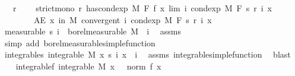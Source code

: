 \begin{isabellebody}
\ \ \ r\ \isanewline
\ \ \ {\isachardoublequoteopen}strict{\isacharunderscore}{\kern0pt}mono\ r{\isachardoublequoteclose}\ {\isachardoublequoteopen}has{\isacharunderscore}{\kern0pt}cond{\isacharunderscore}{\kern0pt}exp\ M\ F\ f\ {\isacharparenleft}{\kern0pt}{\isasymlambda}x{\isachardot}{\kern0pt}\ lim\ {\isacharparenleft}{\kern0pt}{\isasymlambda}i{\isachardot}{\kern0pt}\ cond{\isacharunderscore}{\kern0pt}exp\ M\ F\ {\isacharparenleft}{\kern0pt}s\ {\isacharparenleft}{\kern0pt}r\ i{\isacharparenright}{\kern0pt}{\isacharparenright}{\kern0pt}\ x{\isacharparenright}{\kern0pt}{\isacharparenright}{\kern0pt}{\isachardoublequoteclose}\ \isanewline
\ \ \ \ \ \ \ \ {\isachardoublequoteopen}AE\ x\ in\ M{\isachardot}{\kern0pt}\ convergent\ {\isacharparenleft}{\kern0pt}{\isasymlambda}i{\isachardot}{\kern0pt}\ cond{\isacharunderscore}{\kern0pt}exp\ M\ F\ {\isacharparenleft}{\kern0pt}s\ {\isacharparenleft}{\kern0pt}r\ i{\isacharparenright}{\kern0pt}{\isacharparenright}{\kern0pt}\ x{\isacharparenright}{\kern0pt}{\isachardoublequoteclose}\isanewline
%
\isadelimproof
%
\endisadelimproof
%
\isatagproof
{}\isamarkupfalse%
\ {\isacharminus}{\kern0pt}\isanewline
\ \ \isamarkupfalse%
\ {\isacharbrackleft}{\kern0pt}measurable{\isacharbrackright}{\kern0pt}{\isacharcolon}{\kern0pt}\ {\isachardoublequoteopen}{\isacharparenleft}{\kern0pt}s\ i{\isacharparenright}{\kern0pt}\ {\isasymin}\ borel{\isacharunderscore}{\kern0pt}measurable\ M{\isachardoublequoteclose}\ \ i\ \isamarkupfalse%
\ assms{\isacharparenleft}{\kern0pt}{}{\isacharparenright}{\kern0pt}\ \isamarkupfalse%
\ {\isacharparenleft}{\kern0pt}simp\ add{\isacharcolon}{\kern0pt}\ borel{\isacharunderscore}{\kern0pt}measurable{\isacharunderscore}{\kern0pt}simple{\isacharunderscore}{\kern0pt}function{\isacharparenright}{\kern0pt}\isanewline
\ \ \isamarkupfalse%
\ integrable{\isacharunderscore}{\kern0pt}s{\isacharcolon}{\kern0pt}\ {\isachardoublequoteopen}integrable\ M\ {\isacharparenleft}{\kern0pt}{\isasymlambda}x{\isachardot}{\kern0pt}\ s\ i\ x{\isacharparenright}{\kern0pt}{\isachardoublequoteclose}\ \ i\ \isamarkupfalse%
\ assms\ integrable{\isacharunderscore}{\kern0pt}simple{\isacharunderscore}{\kern0pt}function\ \isamarkupfalse%
\ blast\isanewline
\ \ \isamarkupfalse%
\ integrable{\isacharunderscore}{\kern0pt}{}f{\isacharcolon}{\kern0pt}\ {\isachardoublequoteopen}integrable\ M\ {\isacharparenleft}{\kern0pt}{\isasymlambda}x{\isachardot}{\kern0pt}\ {}\ {\isacharasterisk}{\kern0pt}\ norm\ {\isacharparenleft}{\kern0pt}f\ x{\isacharparenright}{\kern0pt}{\isacharparenright}{\kern0pt}{\isachardoublequoteclose}\ \isamarkupfalse%

\end{isabellebody}
